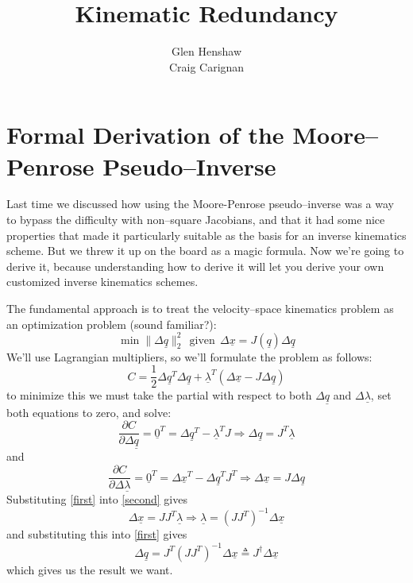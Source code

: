 \documentclass[]{article}
\title{Kinematic Redundancy}
\author{Glen Henshaw\\Craig Carignan}
\begin{document}
\maketitle


\section{Formal Derivation of the Moore--Penrose Pseudo--Inverse }

Last time we discussed how using the Moore-Penrose pseudo--inverse was a way to bypass the difficulty with non--square Jacobians, and that it had some nice properties that made it particularly suitable as the basis for an inverse kinematics scheme. But we threw it up on the board as a magic formula. Now we're going to derive it, because understanding how to derive it will let you derive your own customized inverse kinematics schemes.

The fundamental approach is to treat the velocity--space kinematics problem as an optimization problem (sound familiar?):
\begin{displaymath}
\min \|\Delta \underline{q}\|_{2}^{2} \ \ \text{given}\ \ 	\Delta \underline{x} = J(\underline{q})\Delta\underline{q}
\end{displaymath}
We'll use Lagrangian multipliers, so we'll formulate the problem as follows:
\begin{displaymath}
C = \frac{1}{2} \Delta \underline{q}^{T}\Delta\underline{q} + \underline{\lambda}^{T}(\Delta\underline{x} - J\Delta\underline{q})
\end{displaymath}
to minimize this we must take the partial with respect to both $\Delta\underline{q}$ and $\Delta\underline{\lambda}$, set both equations to zero, and solve:
\begin{equation}
\frac{\partial C}{\partial \Delta\underline{q}} = \underline{0}^{T}= \Delta\underline{q}^{T} - \underline{\lambda}^{T}J \Rightarrow \Delta \underline{q} = J^{T}\underline{\lambda} \label{first}
\end{equation}
and
\begin{equation}
	\frac{\partial C}{\partial \Delta\underline{\lambda}} = \underline{0}^{T} = \Delta\underline{x}^{T} - \Delta\underline{q}^{T}J^{T} \Rightarrow \Delta \underline{x} = J \Delta\underline{q} \label{second}
\end{equation}
Substituting \ref{first} into \ref{second} gives
\begin{displaymath}
\Delta\underline{x}	= JJ^{T}\underline{\lambda} \Rightarrow \underline{\lambda}=(JJ^{T})^{-1}\Delta\underline{x}
\end{displaymath}
and substituting this into \ref{first} gives
\begin{equation}
\Delta\underline{q} = J^{T}(JJ^{T})^{-1}\Delta\underline{x} \triangleq J^{\dag} \Delta\underline{x}
\end{equation}
which gives us the result we want.
\end{document}
